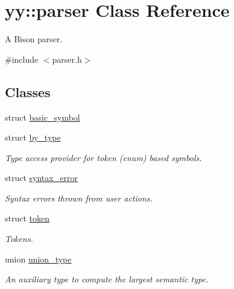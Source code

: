 \hypertarget{classyy_1_1parser}{}\section{yy\+:\+:parser Class Reference}
\label{classyy_1_1parser}


A Bison parser.  




{\ttfamily \#include $<$parser.\+h$>$}

\subsection*{Classes}
\begin{DoxyCompactItemize}
\item 
struct \hyperlink{structyy_1_1parser_1_1basic__symbol}{basic\+\_\+symbol}
\item 
struct \hyperlink{structyy_1_1parser_1_1by__type}{by\+\_\+type}
\begin{DoxyCompactList}\small\item\em Type access provider for token (enum) based symbols. \end{DoxyCompactList}\item 
struct \hyperlink{structyy_1_1parser_1_1syntax__error}{syntax\+\_\+error}
\begin{DoxyCompactList}\small\item\em Syntax errors thrown from user actions. \end{DoxyCompactList}\item 
struct \hyperlink{structyy_1_1parser_1_1token}{token}
\begin{DoxyCompactList}\small\item\em Tokens. \end{DoxyCompactList}\item 
union \hyperlink{unionyy_1_1parser_1_1union__type}{union\+\_\+type}
\begin{DoxyCompactList}\small\item\em An auxiliary type to compute the largest semantic type. \end{DoxyCompactList}\end{DoxyCompactItemize}
